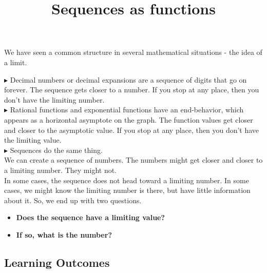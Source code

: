 \documentclass{ximera}
\title{Sequences as functions}
\begin{document}
\begin{abstract}
\end{abstract}

\maketitle




We have seen a common structure in several mathematical situations - the idea of a limit.


\textbf{\textcolor{blue!75!black}{$\blacktriangleright$}}  Decimal numbers or decimal expansions are a sequence of digits that go on forever.  The sequence gets closer to a number. If you stop at any place, then you don't have the limiting number. \\


\textbf{\textcolor{blue!75!black}{$\blacktriangleright$}} Rational functions and exponential functions have an end-behavior, which appears as a horizontal asymptote on the graph.  The function values get closer and closer to the asymptotic value.  If you stop at any place, then you don't have the limiting value. \\


\textbf{\textcolor{blue!75!black}{$\blacktriangleright$}} Sequences do the same thing. \\


We can create a sequence of numbers. The numbers might get closer and closer to a limiting number.  They might not. \\




In some cases, the sequence does not head toward a limiting number. In some cases, we might know the limiting number is there, but have little information about it.  So, we end up with two questions.



\begin{itemize}
\item \textbf{\textcolor{purple!85!blue}{Does the sequence have a limiting value?}} 
\item \textbf{\textcolor{purple!85!blue}{If so, what is the number?}} 
\end{itemize}









\subsection*{Learning Outcomes}
\end{document}
